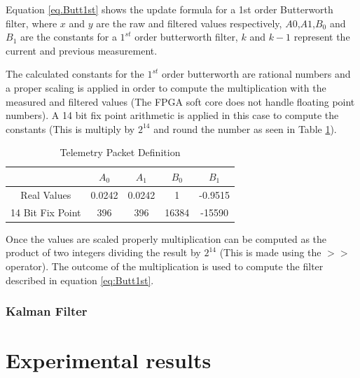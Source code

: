 \documentclass{article}
\begin{document}
Equation \ref{eq.Butt1st} shows the update formula for a 1st order Butterworth filter, where $x$ and $y$ are the raw and filtered values respectively, $A0$,$A1$,$B_0$ and $B_1$ are the constants for a $1^{st}$ order butterworth filter, $k$ and $k-1$ represent the current and previous measurement.

The calculated constants for the $1^{st}$ order butterworth are rational numbers and a proper scaling is applied in order to compute the multiplication with the measured and filtered values (The FPGA soft core does not handle floating point numbers). A 14 bit fix point arithmetic is applied in this case to compute the constants (This is multiply by $2^14$ and round the number as seen in Table \ref{tbl:ButtConstants}).

\begin{table}[ht]
\centering
\caption{Telemetry Packet Definition}
\begin{tabular}{|c|c|c|c|c|}
\hline 
 & $A_0$ & $A_1$ & $B_0$ & $B_1$ \\ 
\hline 
Real Values & 0.0242 & 0.0242 & 1 & -0.9515 \\ 
\hline 
14 Bit Fix Point & 396 & 396 & 16384 & -15590 \\ 
\hline 
\end{tabular}
\label{tbl:ButtConstants}
\end{table}

Once the values are scaled properly multiplication can be computed as the product of two integers dividing the result by $2^14$ (This is made using the $>>$ operator). The outcome of the multiplication is used to compute the filter described in equation \ref{eq:Butt1st}.

\subsubsection{Kalman Filter}







\section{Experimental results}
\label{sec:results}
\end{document}
